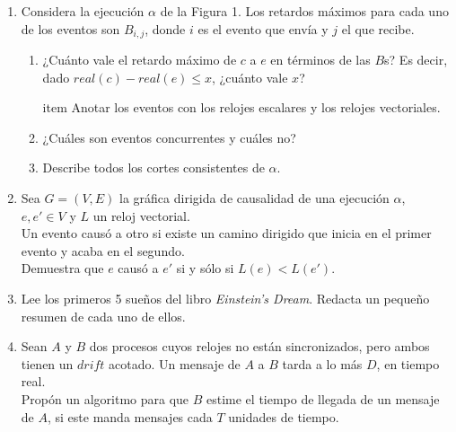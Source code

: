 \documentclass[12pt,a4paper]{report}
\begin{document}
	\begin{enumerate}
		\item {
			Considera la ejecución $\alpha$ de la Figura 1. Los retardos máximos
			para cada uno de los eventos son $B_{i, j}$, donde $i$ es el evento
			que envía y $j$ el que recibe.
			\begin{enumerate}
				\item {
					¿Cuánto vale el retardo máximo de $c$ a $e$ en términos de
					las $B$s? Es decir, dado $real(c)-real(e) \leq x$, ¿cuánto
					vale $x$?
				}

				item {
					Anotar los eventos con los relojes escalares y los relojes
					vectoriales.
				}

				\item {
					¿Cuáles son eventos concurrentes y cuáles no?
				}

				\item {
					Describe todos los cortes consistentes de $\alpha$.
				}
			\end{enumerate}
		}

		\item {
			Sea $G = (V, E)$ la gráfica dirigida de causalidad de una ejecución
			$\alpha$, $e, e' \in V$ y $L$ un reloj vectorial.\\
			Un evento causó a otro si existe un camino dirigido que inicia en
			el primer evento y acaba en el segundo.\\
			Demuestra que $e$ causó a $e'$ si y sólo si $L(e) < L(e')$.
		}

		\item {
			Lee los primeros 5 sueños del libro \textit{Einstein's Dream}.
			Redacta un pequeño resumen de cada uno de ellos.
		}

		\item {
			Sean $A$ y $B$ dos procesos cuyos relojes no están sincronizados,
			pero ambos tienen un $drift$ acotado. Un mensaje de $A$ a $B$
			tarda a lo más $D$, en tiempo real.\\
			Propón un algoritmo para que $B$ estime el tiempo de llegada de un
			mensaje de $A$, si este manda mensajes cada $T$ unidades de tiempo.
		}
	\end{enumerate}
\end{document}
